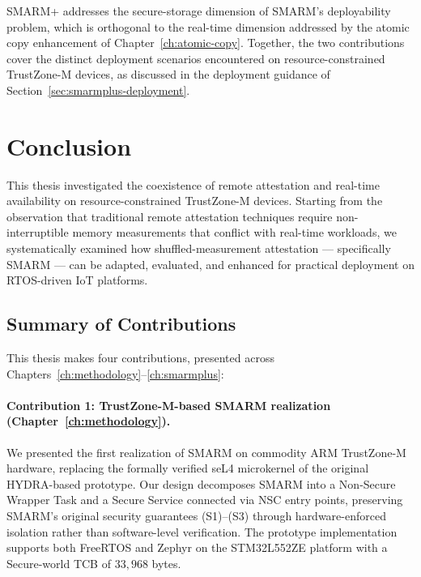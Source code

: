 \documentclass[a4paper,10pt]{article}
\begin{document}
{SMARM+ addresses the secure-storage dimension of SMARM's 
deployability problem, which is orthogonal to the real-time 
dimension addressed by the atomic copy enhancement of 
Chapter~\ref{ch:atomic-copy}. Together, the two contributions 
cover the distinct deployment scenarios encountered on 
resource-constrained TrustZone-M devices, as discussed in the 
deployment guidance of Section~\ref{sec:smarmplus-deployment}.



\section{Conclusion}
\label{ch:conclusion}

This thesis investigated the coexistence of remote attestation and 
real-time availability on resource-constrained TrustZone-M devices. 
Starting from the observation that traditional remote attestation 
techniques require non-interruptible memory measurements that 
conflict with real-time workloads, we systematically examined how 
shuffled-measurement attestation — specifically SMARM — can be 
adapted, evaluated, and enhanced for practical deployment on 
RTOS-driven IoT platforms.

\subsection{Summary of Contributions}
\label{sec:contributions-summary}

This thesis makes four contributions, presented across 
Chapters~\ref{ch:methodology}--\ref{ch:smarmplus}:

\paragraph{Contribution 1: TrustZone-M-based SMARM realization 
(Chapter~\ref{ch:methodology}).}
We presented the first realization of SMARM on commodity ARM 
TrustZone-M hardware, replacing the formally verified seL4 
microkernel of the original HYDRA-based prototype. Our design 
decomposes SMARM into a Non-Secure Wrapper Task and a Secure 
Service connected via NSC entry points, preserving SMARM's 
original security guarantees (S1)--(S3) through hardware-enforced 
isolation rather than software-level verification. The prototype 
implementation supports both FreeRTOS and Zephyr on the 
STM32L552ZE platform with a Secure-world TCB of $33{,}968$ bytes.

}
\end{document}
